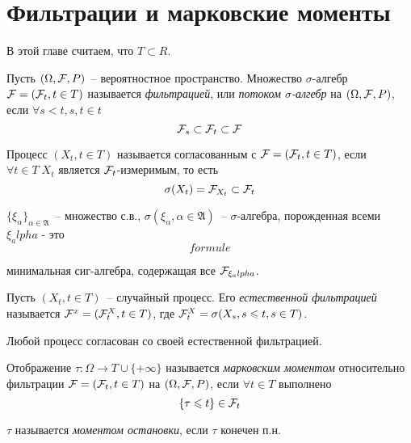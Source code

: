 

\ifdefined\Main\else

\fi

\section{Фильтрации и марковские моменты}
В этой главе считаем, что $T \subset R$.

\begin{definition}
Пусть $(\Omega, \mathcal{F}, P)$~-- вероятностное пространство. Множество
$\sigma$-алгебр $\mathcal{F} = (\mathcal{F}_t, t \in T)$ называется \emph{фильтрацией},
или \emph{потоком $\sigma$-алгебр} на $(\Omega, \mathcal{F}, P)$, если $\forall s < t, s, t \in t$
$$\mathcal{F}_s \subset \mathcal{F}_t \subset \mathcal{F}$$
\end{definition}
\begin{definition}
Процесс $(X_t, t \in T)$ называется согласованным с $\mathcal{F} = (\mathcal{F}_t, t \in T)$, если
$\forall t \in T \; X_t$ является $\mathcal{F}_t$-измеримым, то есть
$$\sigma(X_t) = \mathcal{F}_{X_t} \subset \mathcal{F}_t$$
\end{definition}


\newcommand{\Alpha}{\mathfrak{A}}

\begin{definition}[обозначения]
$\{\xi_\alpha\}_{\alpha \in \Alpha}$~-- множество с.в., $\sigma(\xi_\alpha, \alpha \in \Alpha)$~--
$\sigma$-алгебра, порожденная всеми $\xi_alpha$ -  это
$$formule$$

минимальная сиг-алгебра, содержащая все $\mathcal{F}_{\xi_alpha}$.
\end{definition}

\begin{definition}
Пусть $(X_t, t \in T)$~-- случайный процесс. Его \emph{естественной фильтрацией} называется
$\mathcal{F}^x = (\mathcal{F}_t^X, t \in T)$, где $\mathcal{F}_t^X = \sigma(X_s, s \leqslant t, s \in T)$.
\end{definition}
\begin{remark}[наблюдение]
Любой процесс согласован со своей естественной фильтрацией.
\end{remark}

\begin{definition}
Отображение $\tau: \Omega \to T \cup \{+\infty\}$ называется
\emph{марковским моментом} относительно фильтрации $\mathcal{F} = (\mathcal{F}_t, t \in T)$
на $(\Omega, \mathcal{F}, P)$, если $\forall t \in T$ выполнено
$$\{\tau \leqslant t\} \in \mathcal{F}_t$$

$\tau$ называется \emph{моментом остановки}, если $\tau$ конечен п.н.
\end{definition}

